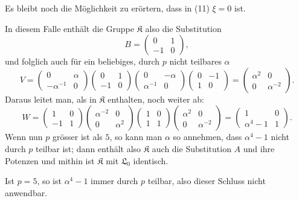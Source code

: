 \documentclass[11pt]{article}
\newcommand{\Lzero}{\mathfrak L_0}
\newcommand{\Kgrp}{\mathfrak K}
\begin{document}
Es bleibt noch die Möglichkeit zu erörtern, dass in (11) $\xi=0$ ist.

In diesem Falle enthält die Gruppe $\Kgrp$ also die Substitution
\[
 B=\begin{pmatrix}0&1\\-1&0\end{pmatrix},
\]
und folglich auch für ein beliebiges, durch $p$ nicht teilbares $\alpha$
\[
 V=\begin{pmatrix}0&\alpha\\-\alpha^{-1}&0\end{pmatrix}
 \begin{pmatrix}0&1\\-1&0\end{pmatrix}
 \begin{pmatrix}0&-\alpha\\\alpha^{-1}&0\end{pmatrix}
 \begin{pmatrix}0&-1\\1&0\end{pmatrix}
 =\begin{pmatrix}\alpha^2&0\\0&\alpha^{-2}\end{pmatrix}.
\]
Daraus leitet man, als in $\Kgrp$ enthalten, noch weiter ab:
\[
 W=\begin{pmatrix}1&0\\-1&1\end{pmatrix}
 \begin{pmatrix}\alpha^{-2}&0\\0&\alpha^2\end{pmatrix}
 \begin{pmatrix}1&0\\1&1\end{pmatrix}
 \begin{pmatrix}\alpha^2&0\\0&\alpha^{-2}\end{pmatrix}
 =\begin{pmatrix}1&0\\ \alpha^4-1&1\end{pmatrix}.
\]
Wenn nun $p$ grösser ist als $5$, so kann man $\alpha$ so annehmen, dass $\alpha^4-1$ nicht durch $p$ teilbar ist; dann enthält also $\Kgrp$ auch die Substitution $A$ und ihre Potenzen und mithin ist $\Kgrp$ mit $\Lzero$ identisch.

Ist $p=5$, so ist $\alpha^4-1$ immer durch $p$ teilbar, also dieser Schluss nicht anwendbar.
\end{document}

